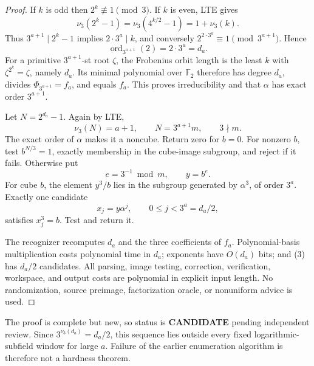 \documentclass[11pt]{article}
\newcommand{\F}{\mathbb F_2}
\newcommand{\CAND}{\textbf{CANDIDATE}}
\begin{document}
\begin{proof}
If $k$ is odd then $2^k\not\equiv1\pmod3$.  If $k$ is even, LTE gives
\[
 \nu_3(2^k-1)=\nu_3(4^{k/2}-1)=1+\nu_3(k).
\]
Thus $3^{a+1}\mid2^k-1$ implies $2\cdot3^a\mid k$, and conversely
$2^{2\cdot3^a}\equiv1\pmod{3^{a+1}}$.  Hence
\[
 \operatorname{ord}_{3^{a+1}}(2)=2\cdot3^a=d_a. \tag{1}
\]
For a primitive $3^{a+1}$-st root $\zeta$, the Frobenius orbit length is
the least $k$ with $\zeta^{2^k}=\zeta$, namely $d_a$.  Its minimal
polynomial over $\F$ therefore has degree $d_a$, divides
$\Phi_{3^{a+1}}=f_a$, and equals $f_a$.  This proves irreducibility and
that $\alpha$ has exact order $3^{a+1}$.

Let $N=2^{d_a}-1$.  Again by LTE,
\[
 \nu_3(N)=a+1,\qquad N=3^{a+1}m,\qquad 3\nmid m. \tag{2}
\]
The exact order of $\alpha$ makes it a noncube.  Return zero for $b=0$.
For nonzero $b$, test $b^{N/3}=1$, exactly membership in the cube-image
subgroup, and reject if it fails.  Otherwise put
\[
 e=3^{-1}\bmod m,\qquad y=b^e.
\]
For cube $b$, the element $y^3/b$ lies in the subgroup generated by
$\alpha^3$, of order $3^a$.  Exactly one candidate
\[
 x_j=y\alpha^j,\qquad 0\le j<3^a=d_a/2, \tag{3}
\]
satisfies $x_j^3=b$.  Test and return it.

The recognizer recomputes $d_a$ and the three coefficients of $f_a$.
Polynomial-basis multiplication costs polynomial time in $d_a$;
exponents have $O(d_a)$ bits; and (3) has $d_a/2$ candidates.  All parsing,
image testing, correction, verification, workspace, and output costs are
polynomial in explicit input length.  No randomization, source preimage,
factorization oracle, or nonuniform advice is used.
\end{proof}

The proof is complete but new, so status is \CAND{} pending independent
review.  Since $3^{\nu_3(d_a)}=d_a/2$, this sequence lies outside every
fixed logarithmic-subfield window for large $a$.  Failure of the earlier
enumeration algorithm is therefore not a hardness theorem.
\end{document}
